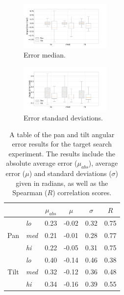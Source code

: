\documentclass[sigconf, review=true, screen=true, anonymous=true]{acmart}
\begin{document}
\begin{figure}
  \centering
  \includegraphics[clip, trim=20 -70 100 100, width=0.4\textwidth]{figures/err_boxplot_medians.png}
  \caption{Error median.}
  \label{fig:err-boxplot-median}
\end{figure}

\begin{figure}
  \centering
  \includegraphics[clip, trim=80 -70 100 0, width=0.4\textwidth]{figures/err_boxplot_std.png}
  \caption{Error standard deviations.}
  \label{fig:err-boxplot-std}
\end{figure}

\begin{table}
  \centering
  \caption{A table of the pan and tilt angular error results for the target search experiment. The results include the absolute average error ($\mu_{abs}$), average error ($\mu$) and standard deviations ($\sigma$) given in radians, as well as the Spearman ($R$) correlation scores.}
  \label{tab:results}
  \begin{tabular}{|c|l|c|c|c|c|}
    \hline
    \multicolumn{2}{|c|}{} & $\mu_{abs}$ & $\mu$ & $\sigma$ & $R$ \\\hline\hline
    & \emph{lo}  & 0.23 & -0.02 & 0.32 & 0.75 \\\cline{2-6}
    Pan & \emph{med} & 0.21 & -0.01 & 0.28 & 0.77 \\\cline{2-6}
    & \emph{hi}  & 0.22 & -0.05 & 0.31 & 0.75 \\\hline\hline
    & \emph{lo}  & 0.40 & -0.14 & 0.46 & 0.38 \\\cline{2-6}
    Tilt & \emph{med} & 0.32 & -0.12 & 0.36 & 0.48 \\\cline{2-6}
    & \emph{hi}  & 0.34 & -0.16 & 0.39 & 0.55 \\\hline
  \end{tabular}
\end{table}
\end{document}
